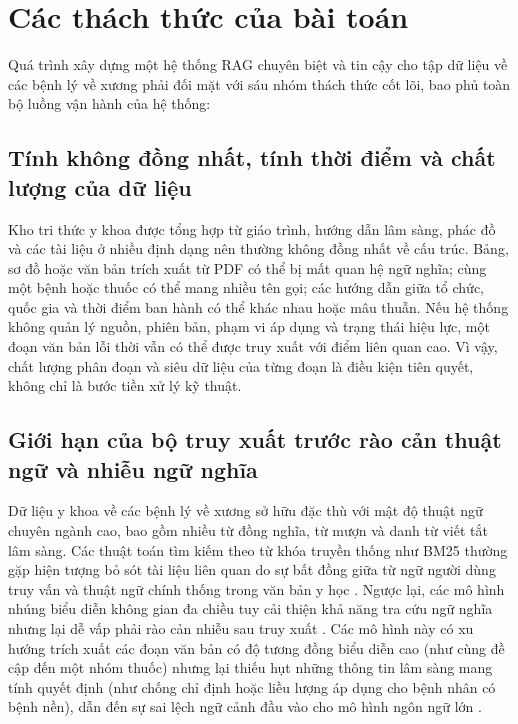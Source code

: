 \section{Các thách thức của bài toán}

Quá trình xây dựng một hệ thống RAG chuyên biệt và tin cậy cho tập dữ liệu về các bệnh lý về xương phải đối mặt với sáu nhóm thách thức cốt lõi, bao phủ toàn bộ luồng vận hành của hệ thống:

\subsection{Tính không đồng nhất, tính thời điểm và chất lượng của dữ liệu}
Kho tri thức y khoa được tổng hợp từ giáo trình, hướng dẫn lâm sàng, phác đồ và các tài liệu ở nhiều định dạng nên thường không đồng nhất về cấu trúc. Bảng, sơ đồ hoặc văn bản trích xuất từ PDF có thể bị mất quan hệ ngữ nghĩa; cùng một bệnh hoặc thuốc có thể mang nhiều tên gọi; các hướng dẫn giữa tổ chức, quốc gia và thời điểm ban hành có thể khác nhau hoặc mâu thuẫn. Nếu hệ thống không quản lý nguồn, phiên bản, phạm vi áp dụng và trạng thái hiệu lực, một đoạn văn bản lỗi thời vẫn có thể được truy xuất với điểm liên quan cao. Vì vậy, chất lượng phân đoạn và siêu dữ liệu của từng đoạn là điều kiện tiên quyết, không chỉ là bước tiền xử lý kỹ thuật.

\subsection{Giới hạn của bộ truy xuất trước rào cản thuật ngữ và nhiễu ngữ nghĩa}
Dữ liệu y khoa về các bệnh lý về xương sở hữu đặc thù với mật độ thuật ngữ chuyên ngành cao, bao gồm nhiều từ đồng nghĩa, từ mượn và danh từ viết tắt lâm sàng. Các thuật toán tìm kiếm theo từ khóa truyền thống như BM25 thường gặp hiện tượng bỏ sót tài liệu liên quan do sự bất đồng giữa từ ngữ người dùng truy vấn và thuật ngữ chính thống trong văn bản y học \cite{medrag2024}. Ngược lại, các mô hình nhúng biểu diễn không gian đa chiều tuy cải thiện khả năng tra cứu ngữ nghĩa nhưng lại dễ vấp phải rào cản nhiễu sau truy xuất \cite{xiong2024mirage}. Các mô hình này có xu hướng trích xuất các đoạn văn bản có độ tương đồng biểu diễn cao (như cùng đề cập đến một nhóm thuốc) nhưng lại thiếu hụt những thông tin lâm sàng mang tính quyết định (như chống chỉ định hoặc liều lượng áp dụng cho bệnh nhân có bệnh nền), dẫn đến sự sai lệch ngữ cảnh đầu vào cho mô hình ngôn ngữ lớn \cite{medtrustrag}.

